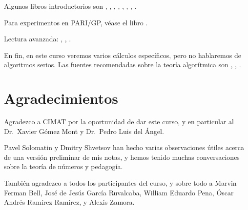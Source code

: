 Algunos libros introductorios son
\cite[Chapters 12, 13, 17]{Ireland-Rosen}, 
\cite{Alaca-Williams},
\cite{Kato-NT-2},
\cite{Frohlich-Taylor},
\cite{Marcus-NF},
\cite{Samuel-TAN},
\cite[Chapters 4, 5]{Borevich-Shafarevich},
\cite{Cox-2013}.

Para experimentos en PARI/GP, véase el libro
\cite{Rodriguez-Villegas-2007}.

Lectura avanzada:
\cite{Neukirch-ANT},
\cite{Lang-ANT},
\cite{Cassels-Frohlich}.

En fin, en este curso veremos varios cálculos específicos, pero no hablaremos
de algoritmos serios. Las fuentes recomendadas sobre la teoría algorítmica
son
\cite{Pohst-Zassenhaus},
\cite{Lenstra-1992},
\cite{Cohen-GTM138}.

\section{Agradecimientos}

Agradezco a CIMAT por la oportunidad de dar este curso, y en particular
al Dr.~Xavier Gómez Mont y Dr.~Pedro Luis del Ángel.

Pavel Solomatin y Dmitry Shvetsov han hecho varias observaciones útiles acerca
de una versión preliminar de mis notas, y hemos tenido muchas conversaciones
sobre la teoría de números y pedagogía.

También agradezco a todos los participantes del curso, y sobre todo a
Marvin Ferman Bell,
José de Jesús García Ruvalcaba,
William Eduardo Pena,
Óscar Andrés Ramírez Ramírez,
y Alexis Zamora.
